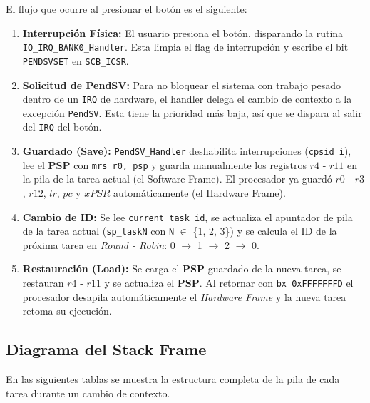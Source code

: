 \documentclass[12pt,letterpaper]{article}
\begin{document}
El flujo que ocurre al presionar el botón es el siguiente:
\begin{enumerate}
\item \textbf{Interrupción Física:} El usuario presiona el botón, disparando la rutina \texttt{IO\_IRQ\_BANK0\_Handler}. Esta limpia el flag de interrupción y escribe el bit \texttt{PENDSVSET} en \texttt{SCB\_ICSR}.

\item \textbf{Solicitud de PendSV:} Para no bloquear el sistema con trabajo pesado dentro de un \texttt{IRQ} de hardware, el handler delega el cambio de contexto a la excepción \texttt{PendSV}. Esta tiene la prioridad más baja, así que se dispara al salir del \texttt{IRQ} del botón.

\item \textbf{Guardado (Save):} \texttt{PendSV\_Handler} deshabilita interrupciones (\texttt{cpsid i}), lee el \textbf{PSP} con \texttt{mrs r0, psp} y guarda manualmente los registros $r4$ - $r11$ en la pila de la tarea actual (el Software Frame). El procesador ya guardó $r0$ - $r3$, $r12$, $lr$, $pc$ y $xPSR$ automáticamente (el Hardware Frame).

\item \textbf{Cambio de ID:} Se lee \texttt{current\_task\_id}, se actualiza el apuntador de pila de la tarea actual (\texttt{sp\_taskN} con \texttt{N} $\in$ \{1, 2, 3\}) y se calcula el ID de la próxima tarea en \textit{Round - Robin}: 0 $\rightarrow$ 1 $\rightarrow$ 2 $\rightarrow$ 0.

\item \textbf{Restauración (Load):} Se carga el \textbf{PSP} guardado de la nueva tarea, se restauran $r4$ - $r11$ y se actualiza el \textbf{PSP}. Al retornar con \texttt{bx 0xFFFFFFFD} el procesador desapila automáticamente el \textit{Hardware Frame} y la nueva tarea retoma su ejecución.
\end{enumerate}

\subsection*{Diagrama del Stack Frame}

En las siguientes tablas se muestra la estructura completa de la pila de cada tarea durante un cambio de contexto. 

\bigskip
\end{document}

